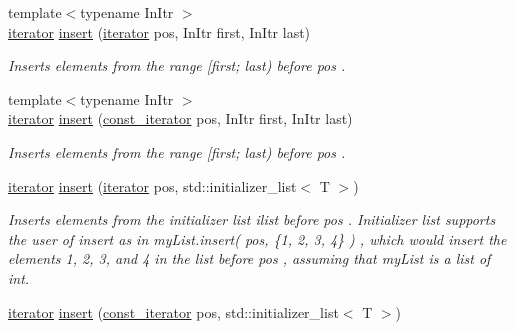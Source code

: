 \begin{DoxyCompactItemize}
{\footnotesize template$<$typename In\+Itr $>$ }\\\hyperlink{classls_1_1list_af036cf72da26107a5084c1e4b45b9cb7}{iterator} \hyperlink{classls_1_1list_a145b47adc8f9ab447baad3c3fa2ccd60}{insert} (\hyperlink{classls_1_1list_af036cf72da26107a5084c1e4b45b9cb7}{iterator} pos, In\+Itr first, In\+Itr last)
\begin{DoxyCompactList}\small\item\em Inserts elements from the range \mbox{[}first; last) before pos . \end{DoxyCompactList}\item 
\mbox{\label{classls_1_1list_a22440e65537058d8758e416cbf7effc8}} 
{\footnotesize template$<$typename In\+Itr $>$ }\\\hyperlink{classls_1_1list_af036cf72da26107a5084c1e4b45b9cb7}{iterator} \hyperlink{classls_1_1list_a22440e65537058d8758e416cbf7effc8}{insert} (\hyperlink{classls_1_1list_ad543276e86075caadf97ae64f2fc7cfc}{const\+\_\+iterator} pos, In\+Itr first, In\+Itr last)
\begin{DoxyCompactList}\small\item\em Inserts elements from the range \mbox{[}first; last) before pos . \end{DoxyCompactList}\item 
\mbox{\label{classls_1_1list_a3781b36cb414bb517672808f98b22938}} 
\hyperlink{classls_1_1list_af036cf72da26107a5084c1e4b45b9cb7}{iterator} \hyperlink{classls_1_1list_a3781b36cb414bb517672808f98b22938}{insert} (\hyperlink{classls_1_1list_af036cf72da26107a5084c1e4b45b9cb7}{iterator} pos, std\+::initializer\+\_\+list$<$ T $>$)
\begin{DoxyCompactList}\small\item\em Inserts elements from the initializer list ilist before pos . Initializer list supports the user of insert as in my\+List.\+insert( pos, \{1, 2, 3, 4\} ) , which would insert the elements 1, 2, 3, and 4 in the list before pos , assuming that my\+List is a list of int. \end{DoxyCompactList}\item 
\mbox{\label{classls_1_1list_a87c6c3007aaec374b29728ec8544b3c1}} 
\hyperlink{classls_1_1list_af036cf72da26107a5084c1e4b45b9cb7}{iterator} \hyperlink{classls_1_1list_a87c6c3007aaec374b29728ec8544b3c1}{insert} (\hyperlink{classls_1_1list_ad543276e86075caadf97ae64f2fc7cfc}{const\+\_\+iterator} pos, std\+::initializer\+\_\+list$<$ T $>$)

\end{DoxyCompactItemize}
